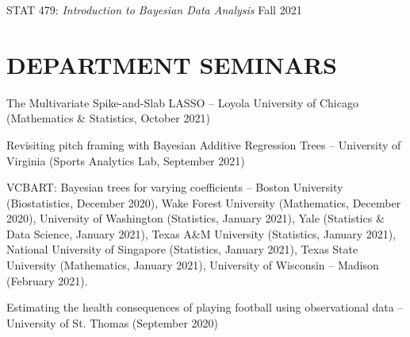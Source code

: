 \documentclass[margin]{res}
\begin{document}
\begin{resume}
STAT 479: {\it Introduction to Bayesian Data Analysis} \hfill Fall 2021












\section{DEPARTMENT \hspace{0.1in} SEMINARS}

The Multivariate Spike-and-Slab LASSO -- Loyola University of Chicago (Mathematics \& Statistics, October 2021)

Revisiting pitch framing with Bayesian Additive Regression Trees -- University of Virginia (Sports Analytics Lab, September 2021)

VCBART: Bayesian trees for varying coefficients -- Boston University (Biostatistics, December 2020), Wake Forest University (Mathematics, December 2020), University of Washington (Statistics, January 2021), 
Yale (Statistics \& Data Science, January 2021), Texas A\&M University (Statistics, January 2021), National University of Singapore (Statistics, January 2021), Texas State University (Mathematics, January 2021), University of Wisconsin -- Madison (February 2021). 

Estimating the health consequences of playing football using observational data -- University of St. Thomas (September 2020)


\end{resume}
\end{document}
